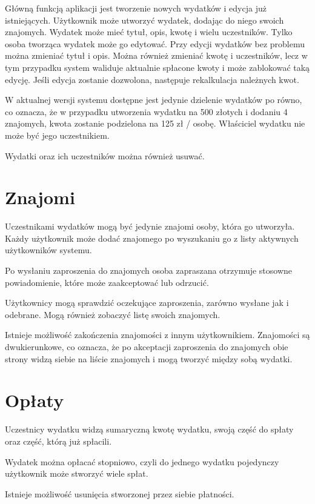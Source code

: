 Główną funkcją aplikacji jest tworzenie nowych wydatków i edycja już istniejących. Użytkownik może utworzyć wydatek, dodając do niego swoich znajomych. Wydatek może mieć tytuł, opis, kwotę i wielu uczestników. Tylko osoba tworząca wydatek może go edytować. Przy edycji wydatków bez problemu można zmieniać tytuł i opis. Można również zmieniać kwotę i uczestników, lecz w tym przypadku system waliduje aktualnie spłacone kwoty i może zablokować taką edycję. Jeśli edycja zostanie dozwolona, następuje rekalkulacja należnych kwot.

W aktualnej wersji systemu dostępne jest jedynie dzielenie wydatków po równo, co oznacza, że w przypadku utworzenia wydatku na 500 złotych i dodaniu 4 znajomych, kwota zostanie podzielona na 125 zł / osobę. Właściciel wydatku nie może być jego uczestnikiem.

Wydatki oraz ich uczestników można również usuwać.

\section{Znajomi}

Uczestnikami wydatków mogą być jedynie znajomi osoby, która go utworzyła. Każdy użytkownik może dodać znajomego po wyszukaniu go z listy aktywnych użytkowników systemu.

Po wysłaniu zaproszenia do znajomych osoba zapraszana otrzymuje stosowne powiadomienie, które może zaakceptować lub odrzucić.

Użytkownicy mogą sprawdzić oczekujące zaproszenia, zarówno wysłane jak i odebrane. Mogą również zobaczyć listę swoich znajomych.

Istnieje możliwość zakończenia znajomości z innym użytkownikiem. Znajomości są dwukierunkowe, co oznacza, że po akceptacji zaproszenia do znajomych obie strony widzą siebie na liście znajomych i mogą tworzyć między sobą wydatki.

\section{Opłaty}

Uczestnicy wydatku widzą sumaryczną kwotę wydatku, swoją część do spłaty oraz część, którą już spłacili.

Wydatek można opłacać stopniowo, czyli do jednego wydatku pojedynczy użytkownik może stworzyć wiele spłat.

Istnieje możliwość usunięcia stworzonej przez siebie płatności.

